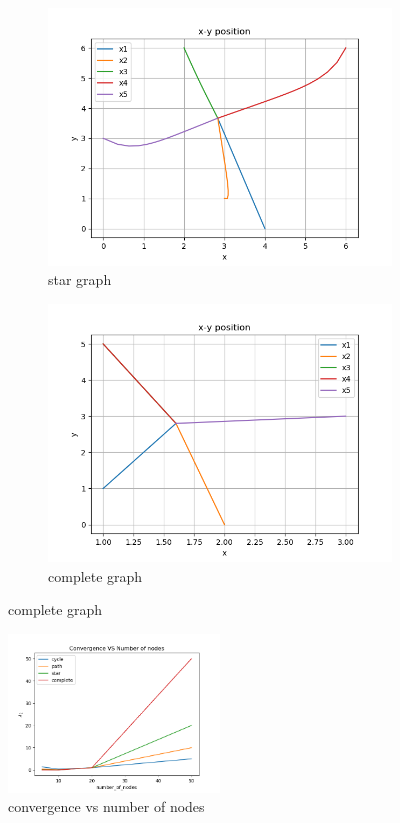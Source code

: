 \documentclass{article}
\begin{document}
\begin{problem}
\begin{figure}
\begin{subfigure}{0.4\textwidth}
            \includegraphics[width=\textwidth]{./img/p1xyposition_star_graph_5.png}
            \caption{star graph}
        \end{subfigure}
        \begin{subfigure}{0.4\textwidth}
            \includegraphics[width=\textwidth]{./img/p1xyposition_complete_graph_5.png}
            \caption{complete graph}
        \end{subfigure}
    \end{figure}
    \begin{figure}
        \centering
        \includegraphics[width=0.5\textwidth]{./img/p1convergence_num_node.png}
        \caption{convergence vs number of nodes}
    \end{figure}
\end{problem}
\end{document}

